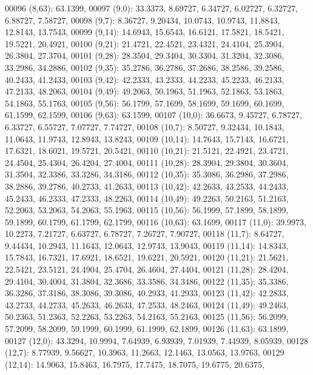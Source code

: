 \begin{DoxyCode}
00096       (8,63): 63.1399,
00097       (9,0): 33.3373, 8.69727, 6.34727, 6.02727, 6.32727, 6.88727, 7.58727,
00098       (9,7): 8.36727, 9.20434, 10.0743, 10.9743, 11.8843, 12.8143, 13.7543,
00099       (9,14): 14.6943, 15.6543, 16.6121, 17.5821, 18.5421, 19.5221, 20.4921,
00100       (9,21): 21.4721, 22.4521, 23.4321, 24.4104, 25.3904, 26.3804, 27.3704,
00101       (9,28): 28.3504, 29.3404, 30.3304, 31.3204, 32.3086, 33.2986, 34.2886,
00102       (9,35): 35.2786, 36.2786, 37.2686, 38.2586, 39.2586, 40.2433, 41.2433,
00103       (9,42): 42.2333, 43.2333, 44.2233, 45.2233, 46.2133, 47.2133, 48.2063,
00104       (9,49): 49.2063, 50.1963, 51.1963, 52.1863, 53.1863, 54.1863, 55.1763,
00105       (9,56): 56.1799, 57.1699, 58.1699, 59.1699, 60.1699, 61.1599, 62.1599,
00106       (9,63): 63.1599,
00107       (10,0): 36.6673, 9.45727, 6.78727, 6.33727, 6.55727, 7.07727, 7.74727,
00108       (10,7): 8.50727, 9.32434, 10.1843, 11.0643, 11.9743, 12.8943, 13.8243,
00109       (10,14): 14.7643, 15.7143, 16.6721, 17.6321, 18.6021, 19.5721, 20.5421,
00110       (10,21): 21.5121, 22.4921, 23.4721, 24.4504, 25.4304, 26.4204, 27.4004,
00111       (10,28): 28.3904, 29.3804, 30.3604, 31.3504, 32.3386, 33.3286, 34.3186,
00112       (10,35): 35.3086, 36.2986, 37.2986, 38.2886, 39.2786, 40.2733, 41.2633,
00113       (10,42): 42.2633, 43.2533, 44.2433, 45.2433, 46.2333, 47.2333, 48.2263,
00114       (10,49): 49.2263, 50.2163, 51.2163, 52.2063, 53.2063, 54.2063, 55.1963,
00115       (10,56): 56.1999, 57.1899, 58.1899, 59.1899, 60.1799, 61.1799, 62.1799,
00116       (10,63): 63.1699,
00117       (11,0): 39.9973, 10.2273, 7.21727, 6.63727, 6.78727, 7.26727, 7.90727,
00118       (11,7): 8.64727, 9.44434, 10.2943, 11.1643, 12.0643, 12.9743, 13.9043,
00119       (11,14): 14.8343, 15.7843, 16.7321, 17.6921, 18.6521, 19.6221, 20.5921,
00120       (11,21): 21.5621, 22.5421, 23.5121, 24.4904, 25.4704, 26.4604, 27.4404,
00121       (11,28): 28.4204, 29.4104, 30.4004, 31.3804, 32.3686, 33.3586, 34.3486,
00122       (11,35): 35.3386, 36.3286, 37.3186, 38.3086, 39.3086, 40.2933, 41.2933,
00123       (11,42): 42.2833, 43.2733, 44.2733, 45.2633, 46.2633, 47.2533, 48.2463,
00124       (11,49): 49.2463, 50.2363, 51.2363, 52.2263, 53.2263, 54.2163, 55.2163,
00125       (11,56): 56.2099, 57.2099, 58.2099, 59.1999, 60.1999, 61.1999, 62.1899,
00126       (11,63): 63.1899,
00127       (12,0): 43.3294, 10.9994, 7.64939, 6.93939, 7.01939, 7.44939, 8.05939,
00128       (12,7): 8.77939, 9.56627, 10.3963, 11.2663, 12.1463, 13.0563, 13.9763,
00129       (12,14): 14.9063, 15.8463, 16.7975, 17.7475, 18.7075, 19.6775, 20.6375,

\end{DoxyCode}
